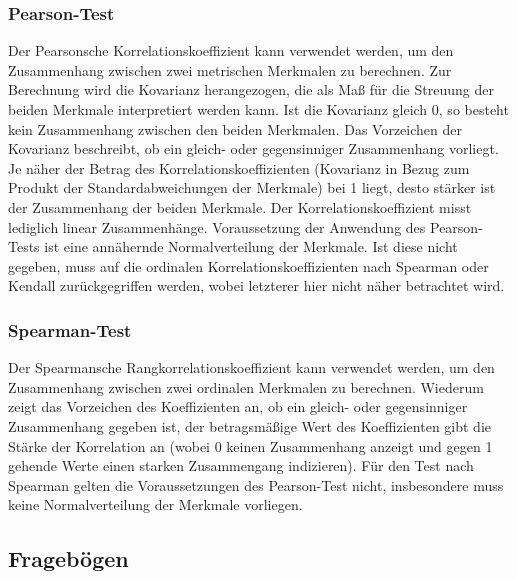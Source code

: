 \subsubsection{Pearson-Test} %
\label{ssub:pearson_test}

Der Pearsonsche Korrelationskoeffizient kann verwendet werden, um den Zusammenhang zwischen zwei metrischen Merkmalen zu berechnen. Zur Berechnung wird die Kovarianz herangezogen, die als Maß für die Streuung der beiden Merkmale interpretiert werden kann. Ist die Kovarianz gleich 0, so besteht kein Zusammenhang zwischen den beiden Merkmalen. Das Vorzeichen der Kovarianz beschreibt, ob ein gleich- oder gegensinniger Zusammenhang vorliegt. Je näher der Betrag des Korrelationskoeffizienten (Kovarianz in Bezug zum Produkt der Standardabweichungen der Merkmale) bei 1 liegt, desto stärker ist der Zusammenhang der beiden Merkmale. Der Korrelationskoeffizient misst lediglich linear Zusammenhänge. Voraussetzung der Anwendung des Pearson-Tests ist eine annähernde Normalverteilung der Merkmale. Ist diese nicht gegeben, muss auf die ordinalen Korrelationskoeffizienten nach Spearman oder Kendall zurückgegriffen werden, wobei letzterer hier nicht näher betrachtet wird. \cite{Duller08}


\subsubsection{Spearman-Test} %
\label{ssub:spearman_test}

Der Spearmansche Rangkorrelationskoeffizient kann verwendet werden, um den Zusammenhang zwischen zwei ordinalen Merkmalen zu berechnen. Wiederum zeigt das Vorzeichen des Koeffizienten an, ob ein gleich- oder gegensinniger Zusammenhang gegeben ist, der betragsmäßige Wert des Koeffizienten gibt die Stärke der Korrelation an (wobei 0 keinen Zusammenhang anzeigt und gegen 1 gehende Werte einen starken Zusammengang indizieren). Für den Test nach Spearman gelten die Voraussetzungen des Pearson-Test nicht, insbesondere muss keine Normalverteilung der Merkmale vorliegen.



\subsection{Fragebögen} %
\label{sub:fragebögen}

